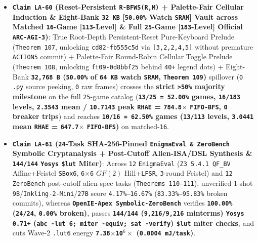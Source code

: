 \documentclass[10pt]{article}
\begin{document}
\begin{itemize}
  \item \textbf{\texttt{Claim LA-60} (Reset-Persistent \texttt{R-BFWS(R,M)} + Palette-Fair Cellular Induction \& Eight-Bank \texttt{32 KB} [\texttt{50.00\%} Watch \texttt{SRAM}] Vault across Matched \texttt{16}-Game [\texttt{113}-Level] \& Full \texttt{25}-Game [\texttt{183}-Level] Official \texttt{ARC-AGI-3})}: True Root-Depth Persistent-Reset Pure-Keyboard Prelude (\texttt{Theorem 107}, unlocking \texttt{cd82-fb555c5d} via \texttt{[3,2,2,4,5]} without premature \texttt{ACTION5} commit) + Palette-Fair Round-Robin Cellular Toggle Prelude (\texttt{Theorem 108}, unlocking \texttt{ft09-0d8bbf25} behind \texttt{40+} legend dots) + Eight-Bank \textbf{\texttt{32,768 B} (\texttt{50.00\%} of \texttt{64 KB} watch \texttt{SRAM}, \texttt{Theorem 109})} spillover (\texttt{0} \texttt{.py} source peeking, \texttt{0} raw frames) crosses the \textbf{strict \texttt{>50\%} majority milestone} on the full \texttt{25}-game catalog (\textbf{\texttt{13/25 = 52.00\%} games, \texttt{16/183} levels, \texttt{2.3543} mean / \texttt{10.7143} peak \texttt{RHAE} = \texttt{784.8$\times$} \texttt{FIFO-BFS}, \texttt{0} breaker trips}) and reaches \textbf{\texttt{10/16 = 62.50\%} games (\texttt{13/113} levels, \texttt{3.0441} mean \texttt{RHAE} = \texttt{647.7$\times$} \texttt{FIFO-BFS})} on matched-\texttt{16}.
  \item \textbf{\texttt{Claim LA-61} (\texttt{24}-Task SHA-256-Pinned \texttt{EnigmaEval \& ZeroBench} Symbolic Cryptanalysis + Post-Cutoff Alien-ISA/DSL Synthesis \& \texttt{144/144} \texttt{Yosys} \texttt{\$lut} Miter)}: Across \texttt{12} \texttt{EnigmaEval} (\texttt{Z3 5.4.1 QF\_BV} Affine+Feistel \texttt{SBox6}, \texttt{6$\times$6} $GF(2)$ Hill+\texttt{LFSR}, \texttt{3}-round Feistel) and \texttt{12} \texttt{ZeroBench} post-cutoff alien-spec tasks (\texttt{Theorems 110--111}), unverified 1-shot \texttt{9B}/\texttt{Inkling-2-Mini}/\texttt{27B} score \texttt{4.17\%--16.67\%} (\texttt{83.33\%--95.83\%} broken commits), whereas \textbf{\texttt{OpenIE-Apex Symbolic-ZeroBench}} verifies \textbf{\texttt{100.00\%} (\texttt{24/24}, \texttt{0.00\%} broken)}, passes \textbf{\texttt{144/144} (\texttt{9,216/9,216} minterms) \texttt{Yosys 0.71+} (\texttt{abc -lut 6; miter -equiv; sat -verify}) \texttt{\$lut} miter checks}, and cuts Wave-2 \texttt{.lut6} energy \textbf{\texttt{7.38$\times$10$^6\times$} (\texttt{0.0004 mJ/task})}.

\end{itemize}
\end{document}
